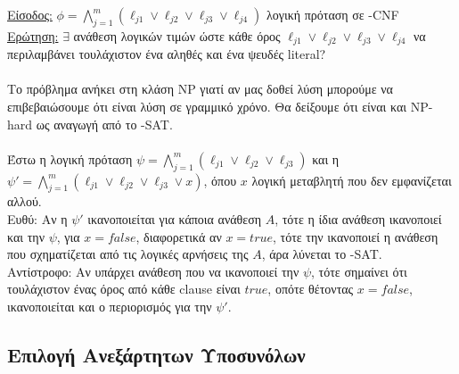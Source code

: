 \documentclass[12pt,a4paper]{article}
\begin{document}
    \underline{Είσοδος:} \(\phi = \bigwedge^{m}_{j=1}(\ell_{j1} \vee \ell_{j2}
    \vee \ell_{j3} \vee \ell_{j4}) \) λογική πρόταση σε {-CNF}
    \\
    \underline{Ερώτηση:} \(\exists\) ανάθεση λογικών τιμών ώστε κάθε όρος
    \(\ell_{j1} \vee \ell_{j2} \vee \ell_{j3} \vee \ell_{j4}\) να περιλαμβάνει
    τουλάχιστον ένα αληθές και ένα ψευδές {\latintext literal}?
    \\
    \\
    Το πρόβλημα ανήκει στη κλάση {\latintext NP} γιατί αν μας δοθεί λύση
    μπορούμε να
    επιβεβαιώσουμε ότι είναι λύση σε γραμμικό χρόνο. Θα δείξουμε ότι είναι και
    {\latintext NP-hard} ως αναγωγή από το {-SAT}.
    \\
    \\
    Έστω η λογική πρόταση \(\psi=\bigwedge^{m}_{j=1}(\ell_{j1} \vee \ell_{j2} 
    \vee \ell_{j3})\) και η \(\psi' = \bigwedge^{m}_{j=1}(\ell_{j1} \vee 
    \ell_{j2} \vee \ell_{j3} \vee x)\), όπου \(x\) λογική μεταβλητή που δεν
    εμφανίζεται αλλού.
    \\
    Ευθύ: Αν η \(\psi'\) ικανοποιείται για κάποια ανάθεση \(A\), τότε η ίδια
    ανάθεση ικανοποιεί και την \(\psi\), για \(x =false\), διαφορετικά αν
    \(x=true\), τότε την ικανοποιεί η ανάθεση που σχηματίζεται από τις λογικές
    αρνήσεις της \(Α\), άρα λύνεται το {-SAT}.
    \\
    Αντίστροφο: Αν υπάρχει ανάθεση που να ικανοποιεί την \(\psi\), τότε σημαίνει
    ότι τουλάχιστον ένας όρος από κάθε {\latintext clause} είναι \(true\),
    οπότε θέτοντας \(x=false\), ικανοποιείται και ο περιορισμός για
    την \(\psi'\).

  \subsection{Επιλογή Ανεξάρτητων Υποσυνόλων}%
\end{document}
